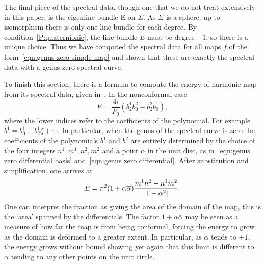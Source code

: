 \documentclass{article}
\begin{document}



The final piece of the spectral data, though one that we do not treat extensively in this paper, is the eigenline bundle E on $\Sigma$. As $\Sigma$ is a sphere, up to isomorphism there is only one line bundle for each degree. By condition~\ref{P:quaternionic}, the line bundle $E$ must be degree $-1$, so there is a unique choice. Thus we have computed the spectral data for all maps $f$ of the form~\eqref{eqn:genus zero simple map} and shown that these are exactly the spectral data with a genus zero spectral curve.

To finish this section, there is a formula to compute the energy of harmonic map from its spectral data, given in~\cite[Theorem 12.17]{Hitchin1990}. In the nonconformal case
\[
E = \frac{4i}{P_0} (b^1_2 b^2_0 - b^2_2 b^1_0),
\]
where the lower indices refer to the coefficients of the polynomial. For example $b^1 = b^1_0 + b^1_2 \zeta + \cdots$. In particular, when the genus of the spectral curve is zero the coefficients of the polynomials $b^1$ and $b^2$ are entirely determined by the choice of the four integers $n^1,m^1,n^2, m^2$ and a point $\alpha$ in the unit disc, as in~\eqref{eqn:genus zero differential basis} and~\eqref{eqn:genus zero differential}. After substitution and simplification, one arrives at
\[
E = \pi^2(1+\alpha\overline{\alpha})\frac{m^1 n^2 - n^1 m^2}{\left|1-\alpha^2\right|}.
\]
One can interpret the fraction as giving the area of the domain of the map, this is the `area' spanned by the differentials. 
The factor $1+\alpha\bar{\alpha}$ may be seen as a measure of how far the map is from being conformal, forcing the energy to grow as the domain is deformed to a greater extent. 
In particular, as $\alpha$ tends to $\pm 1$, the energy grows without bound showing yet again that this limit is different to $\alpha$ tending to any other points on the unit circle.
\end{document}
